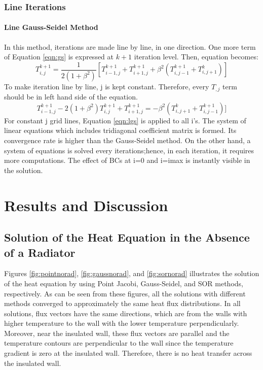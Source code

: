 \documentclass[letterpaper,12pt]{article}
\begin{document}
\subsubsection{Line Iterations}
\paragraph{Line Gauss-Seidel Method} In this method, iterations are made line by line, in one direction. One more term of Equation
\ref{eqn:gs} is expressed at $k+1$ iteration level. Then, equation becomes:
\begin{equation}
	T_{i,j}^{k+1}=\frac{1}{2(1+\beta^2)}[T_{i-1,j}^{k+1}+T_{i+1,j}^{k+1}+\beta ^2(T_{i,j-1}^{k+1}+T_{i,j+1}^{k})]
\end{equation}
To make iteration line by line, j is kept constant. Therefore, every $T_{ ,j}$ term should be in left
hand side of the equation.
\begin{equation}
	T_{i-1,j}^{k+1}-2(1+\beta^2)T_{i,j}^{k+1}+T_{i+1,j}^{k+1}=-\beta^2(T_{i,j+1}^{k}+T_{i,j-1}^{k+1})]
\label{eqn:lgs}
\end{equation}
For constant j grid lines, Equation \ref{eqn:lgs} is applied to all i's. The
system of linear equations which includes tridiagonal coefficient matrix is formed. Its
convergence rate is higher than the Gauss-Seidel method. On the other hand, a system of equations
is solved every iterations;hence, in each iteration, it requires more computations.
The effect of BCs at i=0 and i=imax is instantly visible in the solution.
\newpage
\section{Results and Discussion}

\subsection{Solution of the Heat Equation in the Absence of a Radiator}
Figures \ref{fig:pointnorad}, \ref{fig:gaussnorad}, and \ref{fig:sornorad}
illustrates the solution of the heat equation by using Point Jacobi, Gauss-Seidel,
and SOR methods, respectively. As can be seen from these figures, all the solutions
with different methods converged to approximately the same heat flux distributions.
In all solutions, flux vectors have the same directions, which are from the walls
with higher temperature to the wall with the lower temperature perpendicularly.
Moreover, near the insulated wall, these flux vectors are parallel and the temperature
contours are perpendicular to the wall since the temperature gradient is zero at the
insulated wall. Therefore, there is no heat transfer across the insulated wall. 
\end{document}
